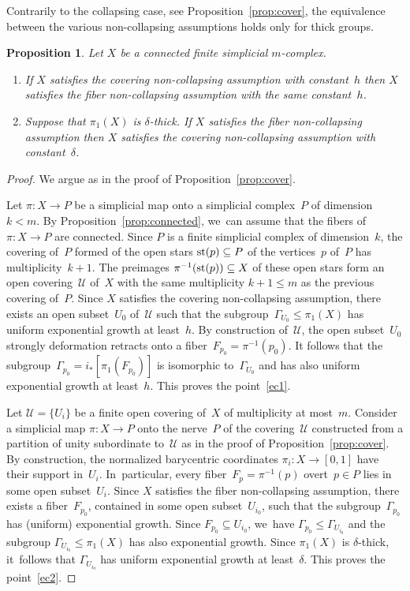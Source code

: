 \documentclass[JEP,XML,SOM,Unicode,NoFloatCountersInSection,published]{cedram}
\newtheorem{proposition}[theorem]{Proposition}
\theoremstyle{definition}
\begin{document}
Contrarily to the collapsing case, see Proposition~\ref{prop:cover}, the equivalence between the various non-collapsing assumptions holds only for thick groups.

\begin{proposition} \label{prop:exp.cover}
Let $X$ be a connected finite simplicial $m$\nobreakdash-complex.
\begin{enumerate}
\item If $X$ satisfies the covering non-collapsing assumption with constant~$h$ then $X$ satisfies the fiber non-collapsing assumption with the same constant~$h$. \label{ec1}
\item Suppose that $\pi_1(X)$ is $\delta$-thick.
If $X$ satisfies the fiber non-collapsing assumption then $X$ satisfies the covering non-collapsing assumption with constant~$\delta$. \label{ec2}
\end{enumerate}
\end{proposition}

\begin{proof}
We argue as in the proof of Proposition~\ref{prop:cover}.

Let $\pi:X \to P$ be a simplicial map onto a simplicial complex~$P$ of dimension~$k < m$.
By Proposition~\ref{prop:connected}, we~can assume that the fibers of~$\pi:X \to P$ are connected.
Since $P$ is a finite simplicial complex of dimension~$k$, the covering of~$P$ formed of the open stars ${\rm st}(p) \subseteq P$ of the vertices~$p$ of~$P$ has multiplicity~$k+1$.
The preimages $\pi^{-1}({\rm st}(p)) \subseteq X$ of these open stars form an open covering~$\mathcal{U}$ of~$X$ with the same multiplicity $k+1 \leq m$ as the previous covering of~$P$.
Since $X$ satisfies the covering non-collapsing assumption, there exists an open subset~$U_0$ of~$\mathcal{U}$ such that the subgroup~$\Gamma_{U_0} \leqslant \pi_1(X)$ has uniform exponential growth at least~$h$.
By construction of~$\mathcal{U}$, the open subset~$U_0$ strongly deformation retracts onto a fiber~$F_{p_0}=\pi^{-1}(p_0)$.
It follows that the subgroup~$\Gamma_{p_0} = i_*[\pi_1(F_{p_0})]$ is isomorphic to~$\Gamma_{U_0}$ and has also uniform exponential growth at least~$h$.
This proves the point~\eqref{ec1}.

Let $\mathcal{U}=\{U_i\}$ be a finite open covering of~$X$ of multiplicity at most~$m$.
Consider a simplicial map $\pi:X \to P$ onto the nerve~$P$ of the covering~$\mathcal{U}$ constructed from a partition of unity subordinate to~$\mathcal{U}$ as in the proof of Proposition~\ref{prop:cover}.
By construction, the normalized barycentric coordinates $\pi_i:X \to [0,1]$ have their support in~$U_i$. In~particular, every fiber~$F_p=\pi^{-1}(p)$ overt~$p \in P$ lies in some open subset~$U_i$.
Since $X$ satisfies the fiber non-collapsing assumption, there exists a fiber~$F_{p_0}$, contained in some open subset~$U_{i_0}$, such that the subgroup~$\Gamma_{p_0}$ has (uniform) exponential growth.
Since $F_{p_0} \subseteq U_{i_0}$, we~have $\Gamma_{p_0} \leqslant \Gamma_{U_{i_0}}$ and the subgroup $\Gamma_{U_{i_0}} \leqslant \pi_1(X)$ has also exponential growth.
Since $\pi_1(X)$ is $\delta$-thick, it~follows that $\Gamma_{U_{i_0}}$ has uniform exponential growth at least~$\delta$.
This proves the point~\eqref{ec2}.
\end{proof}
\end{document}
